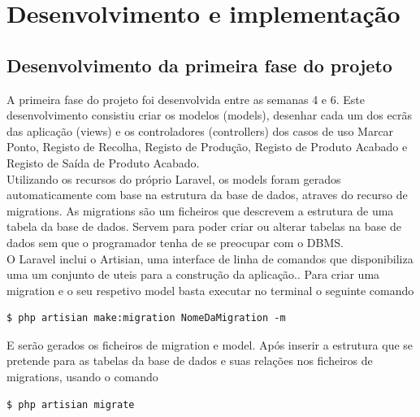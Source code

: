 \chapter{Desenvolvimento e implementação} 
\label{cap:5}


\section{Desenvolvimento da primeira fase do projeto}
A primeira fase do projeto foi desenvolvida entre as semanas 4 e 6. Este desenvolvimento consistiu criar os modelos (models), desenhar cada um dos ecrãs das aplicação (views) e os controladores (controllers) dos casos de uso Marcar Ponto, Registo de Recolha, Registo de Produção, Registo de Produto Acabado e Registo de Saída de Produto Acabado.\\
Utilizando os recursos do próprio Laravel, os models foram gerados automaticamente com base na estrutura da base de dados, atraves do recurso de migrations. As migrations são um ficheiros que descrevem a estrutura de uma tabela da base de dados. Servem para poder criar ou alterar tabelas na base de dados sem que o programador tenha de se preocupar com o DBMS\label{sym:DBMG}.\\
O Laravel inclui o Artisian, uma interface de linha de comandos que disponibiliza uma um conjunto de uteis para a construção da aplicação.\cite{Laravel}.
Para criar uma migration e o seu respetivo model basta executar no terminal o seguinte comando

\begin{lstlisting}
$ php artisian make:migration NomeDaMigration -m
\end{lstlisting}

\noindent
E serão gerados os ficheiros de migration e model. Após inserir a estrutura que se pretende para as tabelas da base de dados e suas relações nos ficheiros de migrations, usando o comando

\begin{lstlisting}
$ php artisian migrate
\end{lstlisting}

